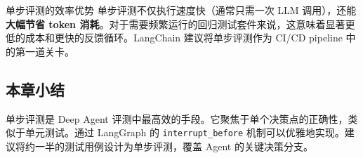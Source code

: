 \begin{importantbox}{单步评测的效率优势}
单步评测不仅执行速度快（通常只需一次 LLM 调用），还能\textbf{大幅节省 token 消耗}。对于需要频繁运行的回归测试套件来说，这意味着显著更低的成本和更快的反馈循环。LangChain 建议将单步评测作为 CI/CD pipeline 中的第一道关卡。
\end{importantbox}

\subsection{本章小结}

单步评测是 Deep Agent 评测中最高效的手段。它聚焦于单个决策点的正确性，类似于单元测试。通过 LangGraph 的 \texttt{interrupt\_before} 机制可以优雅地实现。建议将约一半的测试用例设计为单步评测，覆盖 Agent 的关键决策分支。


